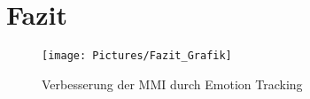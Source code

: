 \section{Fazit}
\begin{figure}[!h]
	\centering
	\texttt{[image: Pictures/Fazit\_Grafik]}
	\caption[Verbesserung der MMI durch Emotion Tracking]{Verbesserung der MMI durch Emotion Tracking}
	\label{fig:fazitgrafik}
\end{figure}
